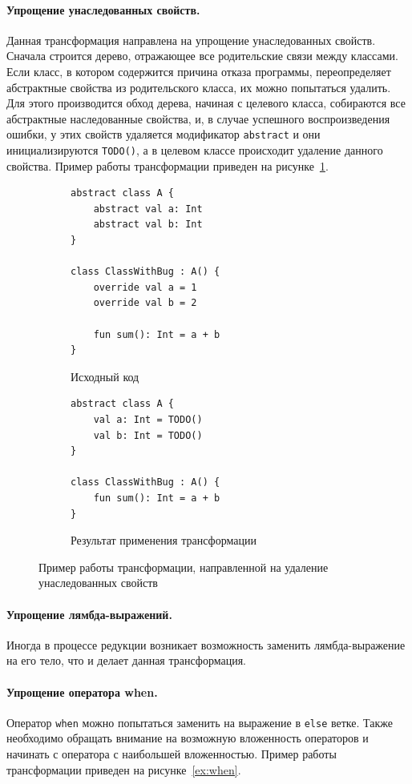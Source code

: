 \paragraph{Упрощение унаследованных свойств.} Данная трансформация направлена на упрощение унаследованных свойств. Сначала строится дерево, отражающее все родительские связи между классами. Если класс, в котором содержится причина отказа программы, переопределяет абстрактные свойства из родительского класса, их можно попытаться удалить. Для этого производится обход дерева, начиная с целевого класса, собираются все абстрактные наследованные свойства, и, в случае успешного воспроизведения ошибки, у этих свойств удаляется модификатор \texttt{abstract} и они инициализируются \texttt{TODO()}, а в целевом классе происходит удаление данного свойства. Пример работы трансформации приведен на рисунке~\ref{ex:prop}.
%
\begin{figure}
\centering
\begin{subfigure}[t]{\linewidth}
\begin{lstlisting}
abstract class A {
    abstract val a: Int
    abstract val b: Int
}

class ClassWithBug : A() {
    override val a = 1
    override val b = 2
    
    fun sum(): Int = a + b
}
\end{lstlisting}
\caption{Исходный код}
\end{subfigure}
\begin{subfigure}[t]{\linewidth}
\begin{lstlisting}
abstract class A {
    val a: Int = TODO()
    val b: Int = TODO()
}

class ClassWithBug : A() {
    fun sum(): Int = a + b
}
\end{lstlisting}
\caption{Результат применения трансформации}
\end{subfigure}
\caption{\label{ex:prop}Пример работы трансформации, направленной на удаление унаследованных свойств}
\end{figure}

\paragraph{Упрощение лямбда-выражений.} Иногда в процессе редукции возникает возможность заменить лямбда-выражение на его тело, что и делает данная трансформация. 

\paragraph{Упрощение оператора when.} Оператор \texttt{when} можно попытаться заменить на выражение в \texttt{else} ветке. Также необходимо обращать внимание на возможную вложенность операторов и начинать с оператора с наибольшей вложенностью. Пример работы трансформации приведен на рисунке~\ref{ex:when}.


